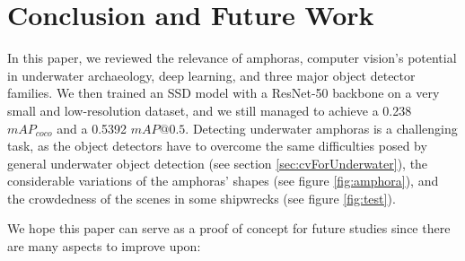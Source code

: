 \documentclass[a4paper, 11pt, oneside]{article}
\begin{document}
\clearpage

\section{Conclusion and Future Work}

In this paper, we reviewed the relevance of amphoras, computer vision's potential in underwater archaeology, deep
learning, and three major object detector families. We then trained an SSD model with a ResNet-50 backbone
on a very small and low-resolution dataset, and we still managed to achieve a 0.238 $mAP_{coco}$ and a 0.5392
$mAP@0.5$. Detecting underwater amphoras is a challenging task, as the object detectors have to overcome the same
difficulties posed by general underwater object detection (see section \ref{sec:cvForUnderwater}), the considerable
variations of the amphoras' shapes (see figure \ref{fig:amphora}), and the crowdedness of the scenes in some
shipwrecks (see figure \ref{fig:test}).

We hope this paper can serve as a proof of concept for future studies since there are many aspects to improve upon:
\end{document}

